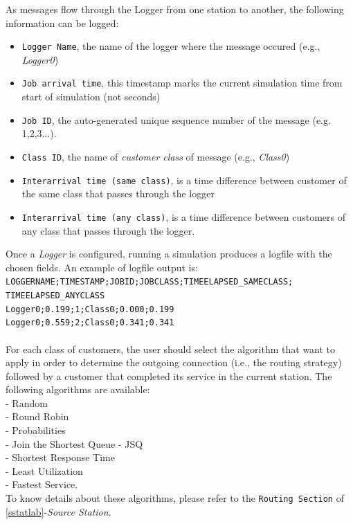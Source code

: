 As messages flow through the Logger from one station to another,
the following information can be logged:
\begin{itemize} \item \texttt{Logger Name}, the name of the logger
where the message occured (e.g., \emph{Logger0}) \item \texttt{Job
arrival time}, this timestamp marks the current simulation time
from start of simulation (not seconds) \item \texttt{Job ID}, the
auto-generated unique sequence number of the message (e.g.
1,2,3...). \item \texttt{Class ID}, the name of \emph{customer
class} of message (e.g., \emph{Class0}) \item \texttt{Interarrival
time (same class)}, is a time difference between customer of the
same class that passes through the logger \item
\texttt{Interarrival time (any class)}, is a time difference
between customers of any class that passes through the logger.
\end{itemize}

Once a \emph{Logger} is configured, running a simulation produces
a logfile with the chosen fields. An example
of logfile output is:\\
\texttt{LOGGERNAME;TIMESTAMP;JOBID;JOBCLASS;TIMEELAPSED\_SAMECLASS;
TIMEELAPSED\_ANYCLASS\\ Logger0;0.199;1;Class0;0.000;0.199\\
Logger0;0.559;2;Class0;0.341;0.341}\\

\\
For each class of customers, the user should select the algorithm
that want to apply in order to determine the outgoing connection
(i.e., the routing strategy) followed by a customer  that
completed its service in the current station.
The following algorithms are available:\\
- Random\\ - Round Robin\\ - Probabilities\\ - Join the Shortest Queue - JSQ\\
- Shortest Response Time\\ - Least Utilization\\ - Fastest Service.\\
To know details about these algorithms, please refer to the
\texttt{Routing Section} of \autoref{sstatlab}-\emph{Source
Station}.


